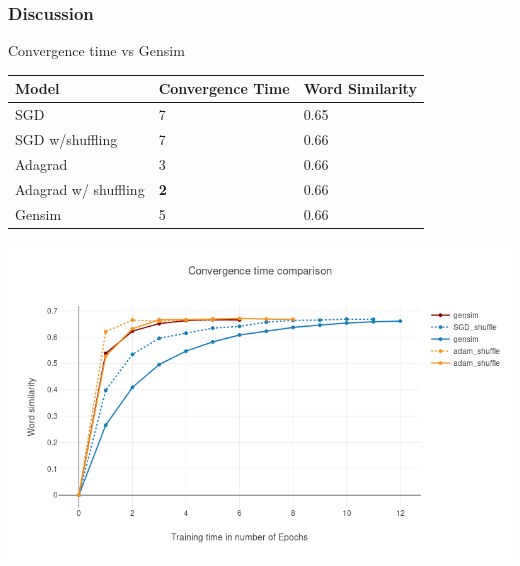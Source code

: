 \begin{frame}
\frametitle{Discussion}
Convergence time vs Gensim 
    \begin{table}[]
\begin{tabular}{|l|l|l|}
\hline
Model    & Convergence Time & Word Similarity \\ \hline
SGD & {7}              & 0.65            \\ \hline
SGD w/shuffling & {7}              & 0.66            \\ \hline
Adagrad & {3}              & 0.66            \\ \hline
Adagrad w/ shuffling & \textbf{2}              & 0.66      \\ \hline
Gensim   & 5          & 0.66            \\ \hline
\end{tabular}
\end{table}
\includegraphics[scale=0.3]{images/gensim_vs_adam}
  \end{frame}